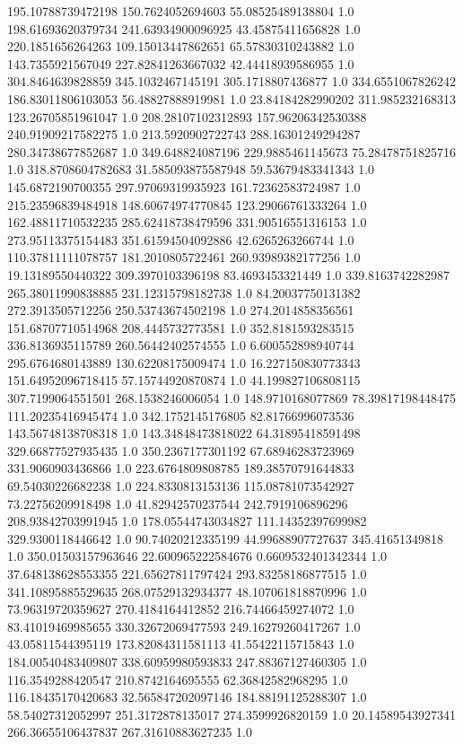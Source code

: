 195.10788739472198	150.7624052694603	55.08525489138804	1.0
198.61693620379734	241.63934900096925	43.45875411656828	1.0
220.1851656264263	109.15013447862651	65.57830310243882	1.0
143.7355921567049	227.82841263667032	42.44418939586955	1.0
304.8464639828859	345.1032467145191	305.1718807436877	1.0
334.6551067826242	186.83011806103053	56.48827888919981	1.0
23.84184282990202	311.985232168313	123.26705851961047	1.0
208.28107102312893	157.96206342530388	240.91909217582275	1.0
213.5920902722743	288.16301249294287	280.34738677852687	1.0
349.648824087196	229.9885461145673	75.28478751825716	1.0
318.8708604782683	31.585093875587948	59.53679483341343	1.0
145.6872190700355	297.97069319935923	161.72362583724987	1.0
215.23596839484918	148.60674974770845	123.29066761333264	1.0
162.48811710532235	285.62418738479596	331.90516551316153	1.0
273.95113375154483	351.61594504092886	42.6265263266744	1.0
110.37811111078757	181.2010805722461	260.93989382177256	1.0
19.13189550440322	309.3970103396198	83.4693453321449	1.0
339.8163742282987	265.38011990838885	231.12315798182738	1.0
84.20037750131382	272.3913505712256	250.53743674502198	1.0
274.2014858356561	151.68707710514968	208.4445732773581	1.0
352.8181593283515	336.8136935115789	260.56442402574555	1.0
6.600552898940744	295.6764680143889	130.62208175009474	1.0
16.227150830773343	151.64952096718415	57.15744920870874	1.0
44.199827106808115	307.7199064551501	268.1538246006054	1.0
148.9710168077869	78.39817198448475	111.20235416945474	1.0
342.1752145176805	82.81766996073536	143.56748138708318	1.0
143.34848473818022	64.31895418591498	329.66877527935435	1.0
350.2367177301192	67.68946283723969	331.9060903436866	1.0
223.6764809808785	189.38570791644833	69.54030226682238	1.0
224.8330813153136	115.08781073542927	73.22756209918498	1.0
41.82942570237544	242.7919106896296	208.93842703991945	1.0
178.05544743034827	111.14352397699982	329.9300118446642	1.0
90.74020212335199	44.99688907727637	345.41651349818	1.0
350.01503157963646	22.600965222584676	0.6609532401342344	1.0
37.648138628553355	221.65627811797424	293.83258186877515	1.0
341.10895885529635	268.07529132934377	48.107061818870996	1.0
73.96319720359627	270.4184164412852	216.74466459274072	1.0
83.41019469985655	330.32672069477593	249.16279260417267	1.0
43.05811544395119	173.82084311581113	41.55422115715843	1.0
184.00540483409807	338.60959980593833	247.88367127460305	1.0
116.3549288420547	210.8742164695555	62.36842582968295	1.0
116.18435170420683	32.565847202097146	184.88191125288307	1.0
58.54027312052997	251.3172878135017	274.3599926820159	1.0
20.14589543927341	266.36655106437837	267.31610883627235	1.0
